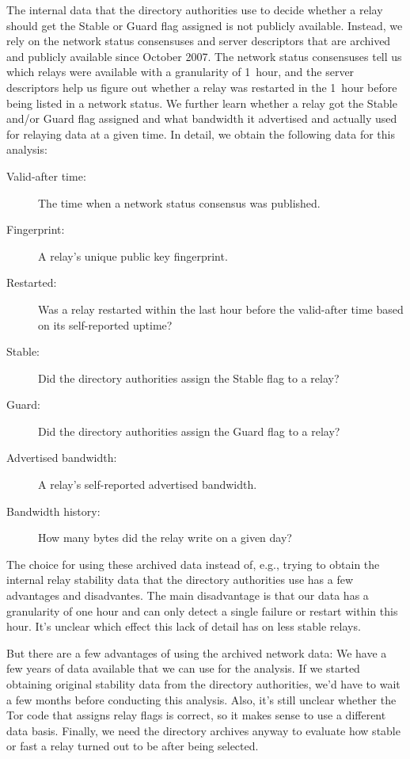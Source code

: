 \documentclass{article}
\begin{document}
The internal data that the directory authorities use to decide whether a
relay should get the Stable or Guard flag assigned is not publicly
available.
Instead, we rely on the network status consensuses and server descriptors
that are archived and publicly available since October
2007.
The network status consensuses tell us which relays were available with a
granularity of 1~hour, and the server descriptors help us figure out
whether a relay was restarted in the 1~hour before being listed in a
network status.
We further learn whether a relay got the Stable and/or Guard flag assigned
and what bandwidth it advertised and actually used for relaying data at a
given time.
In detail, we obtain the following data for this analysis:

\begin{description}
\item[Valid-after time:] The time when a network status consensus was
published.
\item[Fingerprint:] A relay's unique public key fingerprint.
\item[Restarted:] Was a relay restarted within the last hour before the
valid-after time based on its self-reported uptime?
\item[Stable:] Did the directory authorities assign the Stable flag to a
relay?
\item[Guard:] Did the directory authorities assign the Guard flag to a
relay?
\item[Advertised bandwidth:] A relay's self-reported advertised bandwidth.
\item[Bandwidth history:] How many bytes did the relay write on a given
day?
\end{description}

The choice for using these archived data instead of, e.g., trying to
obtain the internal relay stability data that the directory authorities
use has a few advantages and disadvantes.
The main disadvantage is that our data has a granularity of one hour and
can only detect a single failure or restart within this hour.
It's unclear which effect this lack of detail has on less stable relays.

But there are a few advantages of using the archived network data:
We have a few years of data available that we can use for the analysis.
If we started obtaining original stability data from the directory
authorities, we'd have to wait a few months before conducting this
analysis.
Also, it's still unclear whether the Tor code that assigns relay flags is
correct, so it makes sense to use a different data basis.
Finally, we need the directory archives anyway to evaluate how stable or
fast a relay turned out to be after being selected.
\end{document}
